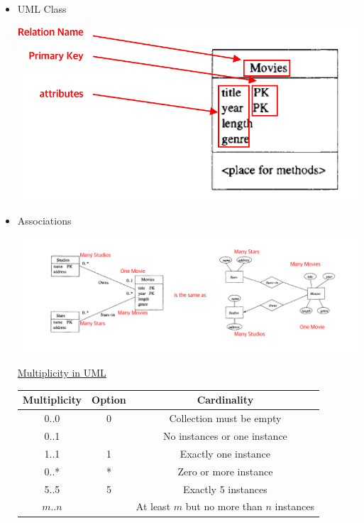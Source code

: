 \documentclass[12pt]{article}
\begin{document}
\begin{enumerate}[1.]
\begin{itemize}
        \item UML Class

        \begin{center}
        \includegraphics[width=0.5\linewidth]{images/worksheet_15_solution_2.png}
        \end{center}

        \item Associations

        \begin{center}
        \includegraphics[width=\linewidth]{images/worksheet_15_solution_4.png}
        \end{center}

        \bigskip

        \underline{Multiplicity in UML}

        \bigskip

        \begin{center}
            \begin{tabular}{|c|c|c|}
                \hline
                Multiplicity & Option & Cardinality\\
                \hline
                0..0 & 0 & Collection must be empty\\
                \hline
                0..1 & & No instances or one instance\\
                \hline
                1..1 & 1 & Exactly one instance\\
                \hline
                0..* & * & Zero or more instance\\
                \hline
                5..5 & 5 & Exactly 5 instances\\
                \hline
                $m..n$ & & At least $m$ but no more than $n$ instances\\
                \hline
            \end{tabular}
        \end{center}


\end{itemize}
\end{enumerate}
\end{document}
